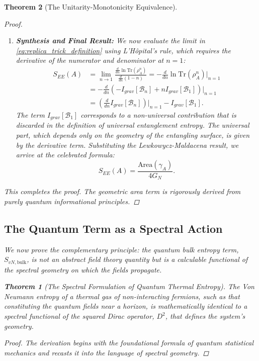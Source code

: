 \documentclass[11pt, letterpaper]{report}
\theoremstyle{plain} %
\newtheorem{theorem}{Theorem}[chapter]
\theoremstyle{definition} %
\theoremstyle{remark} %
\begin{document}
\begin{theorem}[The Unitarity-Monotonicity Equivalence]
\begin{proof}
\begin{enumerate}
    \item \textbf{Synthesis and Final Result:} We now evaluate the limit in \cref{eq:replica_trick_definition} using L'Hôpital's rule, which requires the derivative of the numerator and denominator at $n=1$:
    \begin{align}
        S_{EE}(A) &= \lim_{n \to 1} \frac{\frac{d}{dn} \ln \text{Tr}(\rho_A^n)}{\frac{d}{dn}(1-n)} = -\frac{d}{dn} \ln \text{Tr}(\rho_A^n) \bigg|_{n=1} \nonumber \\
        &= -\frac{d}{dn} \left( -I_{grav}[\mathcal{B}_n] + n I_{grav}[\mathcal{B}_1] \right) \bigg|_{n=1} \nonumber \\
        &= \left( \frac{d}{dn} I_{grav}[\mathcal{B}_n] \right) \bigg|_{n=1} - I_{grav}[\mathcal{B}_1].
    \end{align}
    The term $I_{grav}[\mathcal{B}_1]$ corresponds to a non-universal contribution that is discarded in the definition of universal entanglement entropy. The universal part, which depends only on the geometry of the entangling surface, is given by the derivative term. Substituting the Lewkowycz-Maldacena result, we arrive at the celebrated formula:
    \begin{equation}
        S_{EE}(A) = \frac{\text{Area}(\gamma_A)}{4G_N}.
    \end{equation}
\end{enumerate}
This completes the proof. The geometric area term is rigorously derived from purely quantum informational principles.
\end{proof}

\subsection{The Quantum Term as a Spectral Action}
\label{sec:proof_spectral_from_statmech_revised}
We now prove the complementary principle: the quantum bulk entropy term, $S_{vN, \text{bulk}}$, is not an abstract field theory quantity but is a calculable functional of the spectral geometry on which the fields propagate.

\begin{theorem}[The Spectral Formulation of Quantum Thermal Entropy]
\label{thm:spectral_from_statmech_final}
The Von Neumann entropy of a thermal gas of non-interacting fermions, such as that constituting the quantum fields near a horizon, is mathematically identical to a spectral functional of the squared Dirac operator, $D^2$, that defines the system's geometry.
\end{theorem}
\begin{proof}
The derivation begins with the foundational formula of quantum statistical mechanics and recasts it into the language of spectral geometry.


\end{proof}
\end{theorem}
\end{document}
